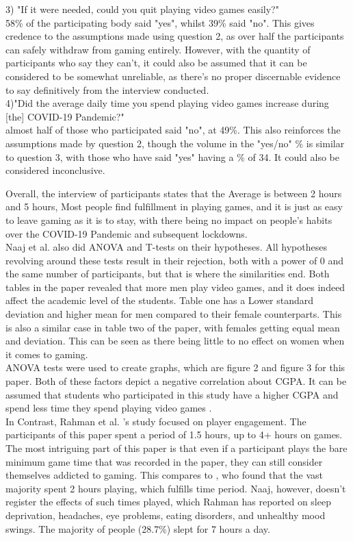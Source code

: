 \documentclass[conference]{IEEEtran}
\begin{document}
3) "If it were needed, could you quit playing video games easily?"\\
58\% of the participating body said "yes", whilst 39\% said "no". This gives credence to the assumptions made using question 2, as over half the participants can safely withdraw from gaming entirely. However, with the quantity of participants who say they can't, it could also be assumed that it can be considered to be somewhat unreliable, as there's no proper discernable evidence to say definitively from the interview conducted.\\ 
 
4)"Did the average daily time you spend playing video games increase during [the] COVID-19 Pandemic?"\\
almost half of those who participated said "no", at 49\%. This also reinforces the assumptions made by question 2, though the volume in the "yes/no" \% is similar to question 3, with those who have said "yes" having a \% of 34. It could also be considered inconclusive.

Overall, the interview of participants states that the Average is between 2 hours and 5 hours, Most people find fulfillment in playing games, and it is just as easy to leave gaming as it is to stay, with there being no impact on people's habits over the COVID-19 Pandemic and subsequent lockdowns.\\

Naaj et al. also did ANOVA and T-tests on their hypotheses. All hypotheses revolving around these tests result in their rejection, both with a power of 0 and the same number of participants, but that is where the similarities end. Both tables in the paper revealed that more men play video games, and it does indeed affect the academic level of the students. Table one has a Lower standard deviation and higher mean for men compared to their female counterparts. This is also a similar case in table two of the paper, with females getting equal mean and deviation. This can be seen as there being little to no effect on women when it comes to gaming.\\

ANOVA tests were used to create graphs, which are figure 2 and figure 3 for this paper. Both of these factors depict a negative correlation about CGPA. It can be assumed that students who participated in this study have a higher CGPA and spend less time they spend playing video games \cite{Naaj2021}.\\

In Contrast, Rahman et al. 's \cite{Rahman2021} study focused on player engagement. The participants of this paper spent a period of 1.5 hours, up to 4+ hours on games. The most intriguing part of this paper is that even if a participant plays the bare minimum game time that was recorded in the paper, they can still consider themselves addicted to gaming. This compares to \cite{Naaj2021}, who found that the vast majority spent 2 hours playing, which fulfills \cite{Rahman2021} time period. Naaj, however, doesn't register the effects of such times played, which Rahman has reported on sleep deprivation, headaches, eye problems, eating disorders, and unhealthy mood swings. The majority of people (28.7\%) slept for 7 hours a day.\\
\end{document}
